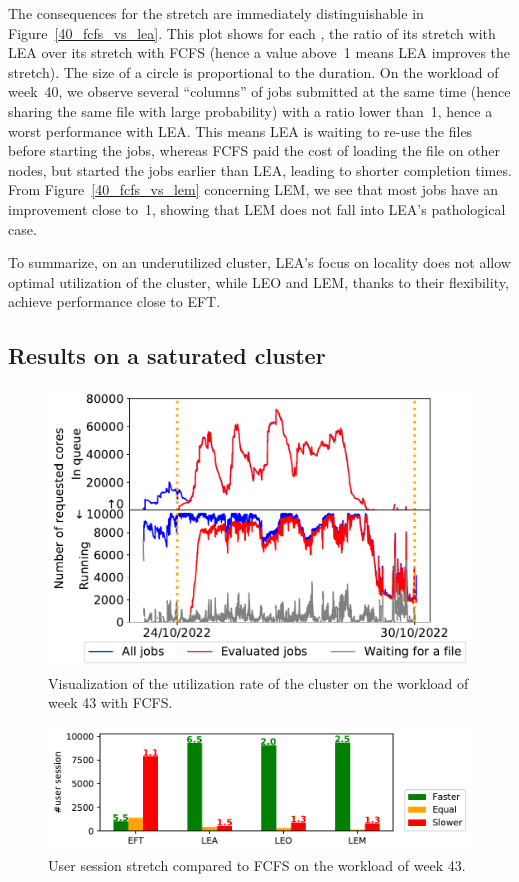 \documentclass[conference]{IEEEtran}
\newcommand{\us}{\ensuremath{\mathit{user~session}}\xspace}
\newcommand{\rev}[1]{{\color{black}{#1}}}
\begin{document}
The consequences for the stretch are immediately distinguishable in Figure~\ref{40_fcfs_vs_lea}.
This plot shows for each \rev{\us}, the ratio of its stretch with LEA over its stretch with FCFS (hence a value above~1 means LEA improves the stretch).
The size of a circle is proportional to the \rev{\us's} duration.
On the workload of week~40, we observe several ``columns'' of jobs submitted at the same time (hence sharing the same file with large probability)
with a ratio lower than~1, hence a worst performance with LEA.
This means LEA is waiting to re-use the files before starting the jobs,
whereas FCFS paid the cost of loading the file on other nodes, but started the jobs
earlier than LEA, leading to shorter completion times.
From Figure~\ref{40_fcfs_vs_lem} concerning LEM, we see that most jobs have an improvement close to~1, showing 
that LEM does not fall into LEA's pathological case.

To summarize, on an underutilized cluster, LEA's focus on locality
does not allow optimal utilization of the cluster, while LEO and LEM, thanks
to their flexibility, achieve performance close to EFT.


\subsection{Results on a saturated cluster}\label{sec.43}

\begin{figure}[t]\centering\includegraphics[width=0.9\linewidth]{../MBSS/plot/Cluster_usage/2022-10-24->2022-10-30_V10000_anonymous_Fcfs_Used_nodes_450_128_32_256_4_1024_core_by_core.pdf}\caption{Visualization of the utilization rate of the cluster on the workload of week 43 with FCFS.}\label{cluster_usage.43}\end{figure}
\begin{figure}[t]\centering\includegraphics[width=1\linewidth]{../MBSS/plot/Boxplot/byuser/small_hist_stretch_10-24-10-30.pdf}\caption{User session stretch compared to FCFS on the workload of week 43.}\label{smallhist.43}\end{figure}
\end{document}
